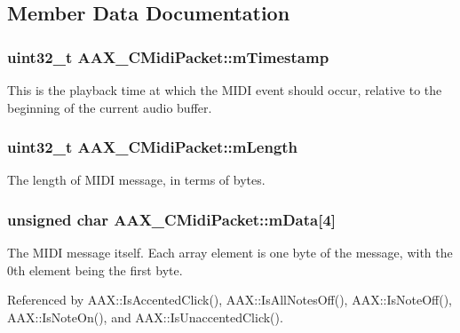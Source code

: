 \subsection{Member Data Documentation}
\hypertarget{a00024_a76df0e71968aa1416b93015ebf23ddc5}{}
\subsubsection[{m\+Timestamp}]{\setlength{\rightskip}{0pt plus 5cm}uint32\+\_\+t A\+A\+X\+\_\+\+C\+Midi\+Packet\+::m\+Timestamp}\label{a00024_a76df0e71968aa1416b93015ebf23ddc5}


This is the playback time at which the M\+I\+D\+I event should occur, relative to the beginning of the current audio buffer. 

\hypertarget{a00024_aa0f16872a37737488aa42f1d9614d6a5}{}
\subsubsection[{m\+Length}]{\setlength{\rightskip}{0pt plus 5cm}uint32\+\_\+t A\+A\+X\+\_\+\+C\+Midi\+Packet\+::m\+Length}\label{a00024_aa0f16872a37737488aa42f1d9614d6a5}


The length of M\+I\+D\+I message, in terms of bytes. 

\hypertarget{a00024_aac7229afc36006bc673eb219b18d8220}{}
\subsubsection[{m\+Data}]{\setlength{\rightskip}{0pt plus 5cm}unsigned char A\+A\+X\+\_\+\+C\+Midi\+Packet\+::m\+Data\mbox{[}4\mbox{]}}\label{a00024_aac7229afc36006bc673eb219b18d8220}


The M\+I\+D\+I message itself. Each array element is one byte of the message, with the 0th element being the first byte. 



Referenced by A\+A\+X\+::\+Is\+Accented\+Click(), A\+A\+X\+::\+Is\+All\+Notes\+Off(), A\+A\+X\+::\+Is\+Note\+Off(), A\+A\+X\+::\+Is\+Note\+On(), and A\+A\+X\+::\+Is\+Unaccented\+Click().

